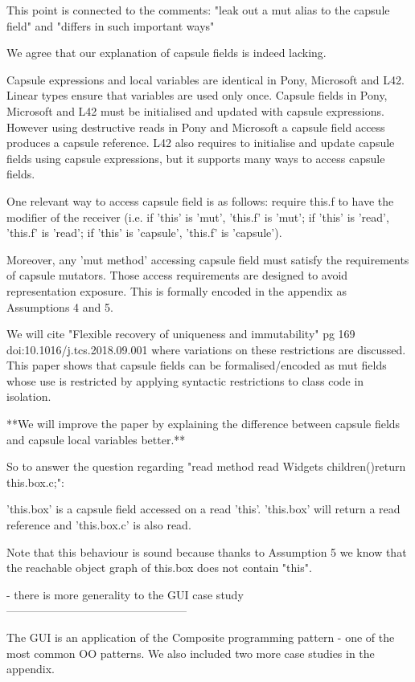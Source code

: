 This point is connected to the comments: "leak out a mut alias to the capsule field" and "differs in such important ways"

We agree that our explanation of capsule fields is indeed lacking.

Capsule expressions and local variables are identical in Pony, Microsoft and L42.
Linear types ensure that variables are used only once.
Capsule fields in Pony, Microsoft and L42 must be initialised and updated with capsule expressions.
However using destructive reads in Pony and Microsoft a capsule field access produces a capsule reference.
L42 also requires to initialise and update capsule fields using capsule expressions,
but it supports many ways to access capsule fields.

One relevant way to access capsule field is as follows: require this.f to have the modifier of the receiver
(i.e. if 'this' is 'mut', 'this.f' is 'mut'; if 'this' is 'read', 'this.f' is 'read'; if 'this' is 'capsule', 'this.f' is 'capsule').

Moreover, any 'mut method' accessing capsule field must satisfy the requirements of capsule mutators.
Those access requirements are designed to avoid representation exposure.
This is formally encoded in the appendix as Assumptions 4 and 5.

We will cite "Flexible recovery of uniqueness and immutability" 
pg 169 doi:10.1016/j.tcs.2018.09.001 where variations on these restrictions  are discussed.
This paper shows that capsule fields can be formalised/encoded as mut fields whose use is restricted
by applying syntactic restrictions to class code in isolation.

**We will improve the paper by explaining the difference between capsule fields and capsule local variables better.**


So to answer the question regarding "read method read Widgets children(){return this.box.c;}":

'this.box' is a capsule field accessed on a read 'this'. 'this.box' will return a read reference
and 'this.box.c' is also read.


Note that this behaviour is sound because thanks to Assumption 5 we know that the reachable object graph
of this.box does not contain "this".


- there is more generality to the GUI case study
------------------------------------------------

The GUI is an application of the Composite programming pattern - one of the most common OO patterns.
We also included two more case studies in the appendix.

